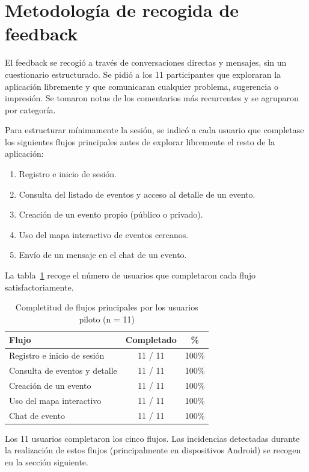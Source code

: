 \section{Metodología de recogida de feedback}

El feedback se recogió a través de conversaciones directas y mensajes, sin un cuestionario estructurado. Se pidió a los 11 participantes que exploraran la aplicación libremente y que comunicaran cualquier problema, sugerencia o impresión. Se tomaron notas de los comentarios más recurrentes y se agruparon por categoría.

Para estructurar mínimamente la sesión, se indicó a cada usuario que completase los siguientes flujos principales antes de explorar libremente el resto de la aplicación:

\begin{enumerate}
    \item Registro e inicio de sesión.
    \item Consulta del listado de eventos y acceso al detalle de un evento.
    \item Creación de un evento propio (público o privado).
    \item Uso del mapa interactivo de eventos cercanos.
    \item Envío de un mensaje en el chat de un evento.
\end{enumerate}

La tabla~\ref{tab:piloto_flujos} recoge el número de usuarios que completaron cada flujo satisfactoriamente.

\begin{table}[H]
\centering
\caption{Completitud de flujos principales por los usuarios piloto (n = 11)}
\label{tab:piloto_flujos}
\begin{tabular}{|l|c|c|}
\hline
\textbf{Flujo} & \textbf{Completado} & \textbf{\%} \\
\hline
Registro e inicio de sesión & 11 / 11 & 100\% \\
\hline
Consulta de eventos y detalle & 11 / 11 & 100\% \\
\hline
Creación de un evento & 11 / 11 & 100\% \\
\hline
Uso del mapa interactivo & 11 / 11 & 100\% \\
\hline
Chat de evento & 11 / 11 & 100\% \\
\hline
\end{tabular}
\end{table}

Los 11 usuarios completaron los cinco flujos. Las incidencias detectadas durante la realización de estos flujos (principalmente en dispositivos Android) se recogen en la sección siguiente.

